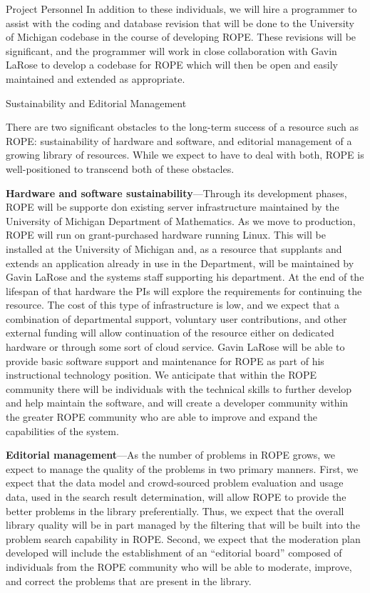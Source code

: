 \documentclass[11pt]{article}
\begin{document}
\begin{section}{Project Personnel}
In addition to these individuals, we will hire a programmer to assist with
the coding and database revision that will be done to the University of
Michigan codebase in the course of developing ROPE. These revisions
will be significant, and the programmer will work in close collaboration
with Gavin LaRose to develop a codebase for ROPE which will then be
open and easily maintained and extended as appropriate. 

\end{section}

\begin{section}{Sustainability and Editorial Management}

There are two significant obstacles to the long-term success of a resource
such as ROPE: sustainability of hardware and software, and editorial
management of a growing library of resources.  While we expect to have to
deal with both, ROPE is well-positioned to transcend both of these
obstacles.

\textbf{Hardware and software sustainability}---Through its development
phases, ROPE will be supporte don existing server infrastructure
maintained by the University of Michigan Department of Mathematics.  As we
move to production, ROPE will run on grant-purchased hardware running
Linux.  This will be installed at the University of Michigan and, as a
resource that supplants and extends an application already in use in the
Department, will be maintained by Gavin LaRose and the systems staff
supporting his department.  At the end of the lifespan of that hardware
the PIs will explore the requirements for continuing the resource.  The
cost of this type of infrastructure is low, and we expect that a
combination of departmental support, voluntary user contributions, and
other external funding will allow continuation of the resource either on
dedicated hardware or through some sort of cloud service.  Gavin LaRose
will be able to provide basic software support and maintenance for ROPE as
part of his instructional technology position.  We anticipate that within
the ROPE community there will be individuals with the technical skills to
further develop and help maintain the software, and will create a
developer community within the greater ROPE community who are able to
improve and expand the capabilities of the system.

\textbf{Editorial management}---As the number of problems in ROPE grows,
we expect to manage the quality of the problems in two primary manners.
First, we expect that the data model and crowd-sourced problem evaluation
and usage data, used in the search result determination, will allow ROPE
to provide the better problems in the library preferentially.  Thus, we
expect that the overall library quality will be in part managed by the
filtering that will be built into the problem search capability in ROPE.
Second, we expect that the moderation plan developed will include the
establishment of an ``editorial board'' composed of individuals from the
ROPE community who will be able to moderate, improve, and correct the
problems that are present in the library.  

\end{section}
\end{document}
